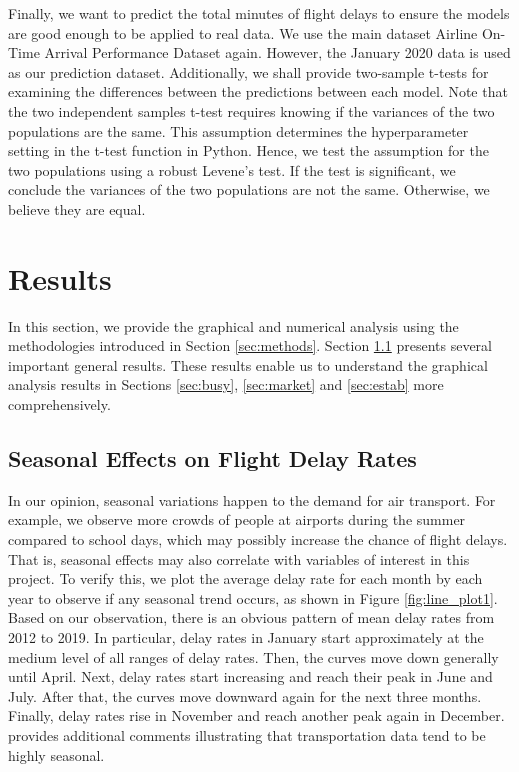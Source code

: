 \documentclass[11pt]{article}
\begin{document}
Finally, we want to predict the total minutes of flight delays to ensure the models are good enough to be applied to real data. We use the main dataset Airline On-Time Arrival Performance Dataset again. However, the January 2020 data is used as our prediction dataset. Additionally, we shall provide two-sample t-tests for examining the differences between the predictions between each model. Note that the two independent samples t-test requires knowing if the variances of the two populations are the same. This assumption determines the hyperparameter setting in the t-test function in Python. Hence, we test the assumption for the two populations using a robust Levene’s test. If the test is significant, we conclude the variances of the two populations are not the same. Otherwise, we believe they are equal.

\section{Results}\label{sec:results}
In this section, we provide the graphical and numerical analysis using the methodologies introduced in Section \ref{sec:methods}. Section \ref{sec:seasonal} presents several important general results. These results enable us to understand the graphical analysis results in Sections \ref{sec:busy}, \ref{sec:market} and \ref{sec:estab} more comprehensively.

\subsection{Seasonal Effects on Flight Delay Rates}\label{sec:seasonal}
In our opinion, seasonal variations happen to the demand for air transport. For example, we observe more crowds of people at airports during the summer compared to school days, which may possibly increase the chance of flight delays. That is, seasonal effects may also correlate with variables of interest in this project. To verify this, we plot the average delay rate for each month by each year to observe if any seasonal trend occurs, as shown in Figure \ref{fig:line_plot1}. Based on our observation, there is an obvious pattern of mean delay rates from 2012 to 2019. In particular, delay rates in January start approximately at the medium level of all ranges of delay rates. Then, the curves move down generally until April. Next, delay rates start increasing and reach their peak in June and July. After that, the curves move downward again for the next three months. Finally, delay rates rise in November and reach another peak again in December. \citet{web:bts5} provides additional comments illustrating that transportation data tend to be highly seasonal.
\end{document}
